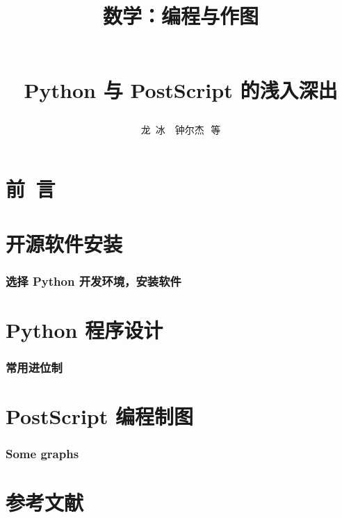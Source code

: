 \documentclass[zihao=-4,linespread=1.5,heading=true,a4paper,twoside]{ctexart}
\title{\begin{kaishu}数学：编程与作图\end{kaishu}\\
	Python 与 PostScript 的浅入深出}
\author{\kaishu 龙\,  冰\, \, 钟尔杰\,\,  等}
\begin{document}
\begin{titlepage}
	\maketitle
\end{titlepage}

\part*{\kaishu 前\, 言}\label{sec:preface}


\newpage\tableofcontents

\newpage\part{开源软件安装}
\section{选择 Python 开发环境，安装软件}\label{sec:II.1}


\newpage\part{Python 程序设计}
\section{常用进位制}\label{sec:II.2}



\newpage\part{PostScript 编程制图}
\section{Some graphs}



\newpage\part*{参考文献}
\printbibliography[heading=none]
\end{document}
